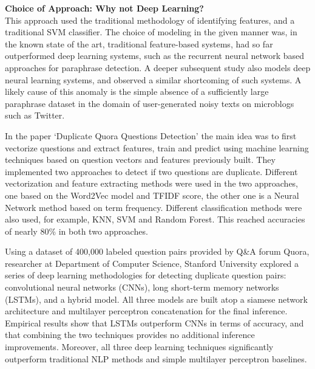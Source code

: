 \textbf{Choice of Approach: Why not Deep Learning?} \\
This approach used the traditional methodology of identifying features, and a traditional SVM classifier. The choice
of modeling in the given manner was, in the known state of the art, traditional feature-based systems, had so far outperformed deep learning systems, such as the recurrent neural network based approaches for paraphrase detection. A deeper subsequent study also models deep neural learning systems, and observed a similar shortcoming of such systems.
A likely cause of this anomaly is the simple absence of a sufficiently large paraphrase dataset in the
domain of user-generated noisy texts on microblogs such as Twitter.

In the paper `Duplicate Quora Questions Detection' \cite{Guo2017DuplicateQQ} the main idea was to first vectorize questions and extract features, train and predict using machine learning techniques based on question vectors and features previously built. They implemented two approaches to detect if two questions are duplicate. Different vectorization and feature extracting methods were used in the two approaches, one based on the Word2Vec model and \ac{TFIDF} score, the other one is a Neural Network method based on term frequency. Different classification methods were also used, for example, \ac{KNN}, \ac{SVM} and Random Forest. This reached accuracies of nearly 80\% in both two approaches.

Using a dataset of 400,000 labeled question pairs provided by Q\&A forum Quora, researcher at Department of Computer Science, Stanford University explored a series of deep learning methodologies for detecting duplicate question pairs: convolutional neural networks (CNNs), long short-term memory networks (LSTMs), and a hybrid model\cite{Addair2017DuplicateQP}. All three models are built atop a siamese network architecture and multilayer perceptron concatenation for the final inference. Empirical results show that LSTMs outperform CNNs in terms of accuracy, and that combining the two techniques provides no additional inference improvements. Moreover, all three deep learning techniques significantly outperform traditional NLP methods and simple multilayer perceptron baselines.

